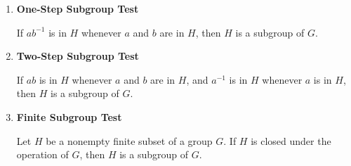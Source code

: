 \documentclass{report}
\newcommand{\inv}{^{-1}}
\begin{document}
\begin{tcolorbox}[title=Subgroup Test]
  \begin{enumerate}
    \item \textbf{One-Step Subgroup Test}
    
    If $ab\inv$ is in $H$ whenever $a$ and $b$ are in $H$, then $H$ is a subgroup of $G$.
    
    \item \textbf{Two-Step Subgroup Test }
    
    If $ab$ is in $H$ whenever $a$ and $b$ are in $H$, and $a\inv$ is in $H$ whenever $a$ is in $H$, then $H$ is a subgroup of $G$.

    \item \textbf{Finite Subgroup Test}
    
    Let $H$ be a nonempty finite subset of a group $G$. If $H$ is closed under the operation of $G$,
    then $H$ is a subgroup of $G$.

  \end{enumerate}
  
\end{tcolorbox}
\end{document}
